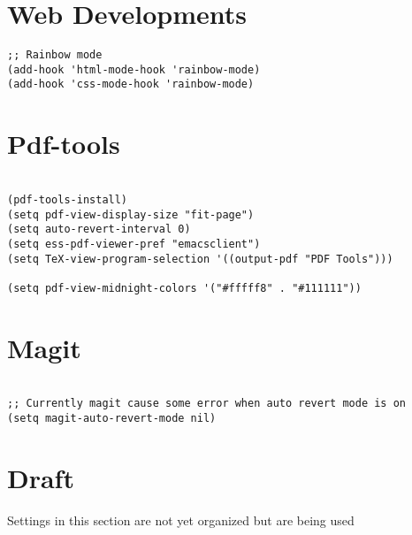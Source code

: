 \documentclass[11pt]{article}
\begin{document}
\section{Web Developments}
\label{sec:org07a031f}
\begin{verbatim}
;; Rainbow mode
(add-hook 'html-mode-hook 'rainbow-mode)
(add-hook 'css-mode-hook 'rainbow-mode)
\end{verbatim}

\section{Pdf-tools}
\label{sec:org304f1a9}

\begin{verbatim}

(pdf-tools-install)
(setq pdf-view-display-size "fit-page")
(setq auto-revert-interval 0)
(setq ess-pdf-viewer-pref "emacsclient")
(setq TeX-view-program-selection '((output-pdf "PDF Tools")))

(setq pdf-view-midnight-colors '("#fffff8" . "#111111"))
\end{verbatim}

\section{Magit}
\label{sec:orge77f68c}

\begin{verbatim}

;; Currently magit cause some error when auto revert mode is on
(setq magit-auto-revert-mode nil)

\end{verbatim}

\section{Draft}
\label{sec:org752ba4d}
Settings in this section are not yet organized but are being used
\end{document}
